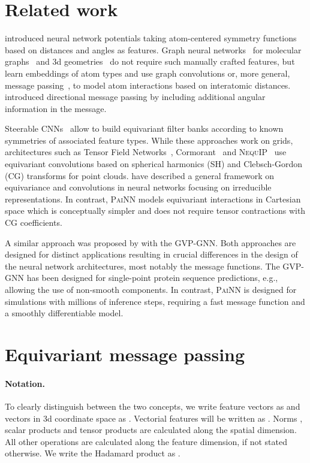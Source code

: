 \documentclass[reprint,
amsmath,amssymb,
 aip,jcp
]{revtex4-2}
\newcommand{\painn}{\textsc{PaiNN}}
\newcommand{\new}[1]{#1}
\begin{document}
\section{Related work}
\citet{behler2007generalized} introduced neural network potentials taking atom-centered symmetry functions based on distances and angles as features.
Graph neural networks~\cite{scarselli2008graph} for molecular graphs~\cite{duvenaud2015convolutional,kearnes2016molecular} and 3d geometries~\cite{schutt2017deep,gilmer2017neural,schutt2018schnet,unke2019physnet,lubbers2018hierarchical} do not require such manually crafted features, but learn embeddings of atom types and use graph convolutions or, more general, message passing~\cite{gilmer2017neural}, to model atom interactions based on interatomic distances.
\citet{klicpera2020directional} introduced directional message passing by including additional angular information in the message.

Steerable CNNs~\cite{cohen2016steerable,weiler20183d} allow to build equivariant filter banks according to known symmetries of associated feature types.
While these approaches work on grids, architectures such as Tensor Field Networks~\cite{thomas2018tensor}, Cormorant~\cite{anderson2019cormorant} and \textsc{NequIP}~\cite{batzner2021se} use equivariant convolutions based on spherical harmonics (SH) and Clebsch-Gordon (CG) transforms for point clouds.
\citet{kondor2018generalization} have described a general framework on equivariance and convolutions in neural networks focusing on irreducible representations.
In contrast, \painn{} models equivariant interactions in Cartesian space which is conceptually simpler and does not require tensor contractions with CG coefficients.
\new{
A similar approach was proposed by \citet{jing2021learning} with the GVP-GNN.
Both approaches are designed for distinct applications resulting in crucial differences in the design of the neural network architectures, most notably the message functions. The GVP-GNN has been designed for single-point protein sequence predictions, e.g., allowing the use of non-smooth components. In contrast, \painn{} is designed for simulations with millions of inference steps, requiring a fast message function and a smoothly differentiable model.}

\section{Equivariant message passing}\label{sec:eqmpnn}

\paragraph{Notation.} To clearly distinguish between the two concepts, we write feature vectors as  and vectors in 3d coordinate space as . Vectorial features will be written as . Norms , scalar products  and tensor products  are calculated along the spatial dimension. All other operations are calculated along the feature dimension, if not stated otherwise. We write the Hadamard product as .
\end{document}
